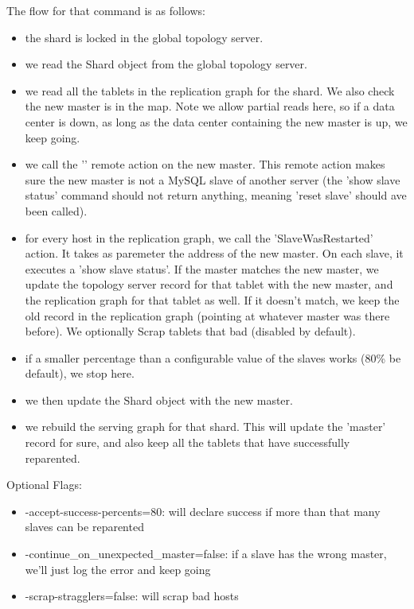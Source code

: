 The flow for that command is as follows:
\begin{itemize}
\item  the shard is locked in the global topology server.
\item  we read the Shard object from the global topology server.
\item  we read all the tablets in the replication graph for the shard. We also check the new master is in the map. Note we allow partial reads here, so if a data center is down, as long as the data center containing the new master is up, we keep going.
\item  we call the '' remote action on the new master. This remote action makes sure the new master is not a MySQL slave of another server (the 'show slave status' command should not return anything, meaning 'reset slave' should ave been called).
\item  for every host in the replication graph, we call the 'SlaveWasRestarted' action. It takes as paremeter the address of the new master. On each slave, it executes a 'show slave status'. If the master matches the new master, we update the topology server record for that tablet with the new master, and the replication graph for that tablet as well. If it doesn't match, we keep the old record in the replication graph (pointing at whatever master was there before). We optionally Scrap tablets that bad (disabled by default).
\item  if a smaller percentage than a configurable value of the slaves works (80\% be default), we stop here.
\item  we then update the Shard object with the new master.
\item  we rebuild the serving graph for that shard. This will update the 'master' record for sure, and also keep all the tablets that have successfully reparented.
\end{itemize}

Optional Flags:
\begin{itemize}
\item  -accept-success-percents=80: will declare success if more than that many slaves can be reparented
\item  -continue\_on\_unexpected\_master=false: if a slave has the wrong master, we'll just log the error and keep going
\item  -scrap-stragglers=false: will scrap bad hosts
\end{itemize}

